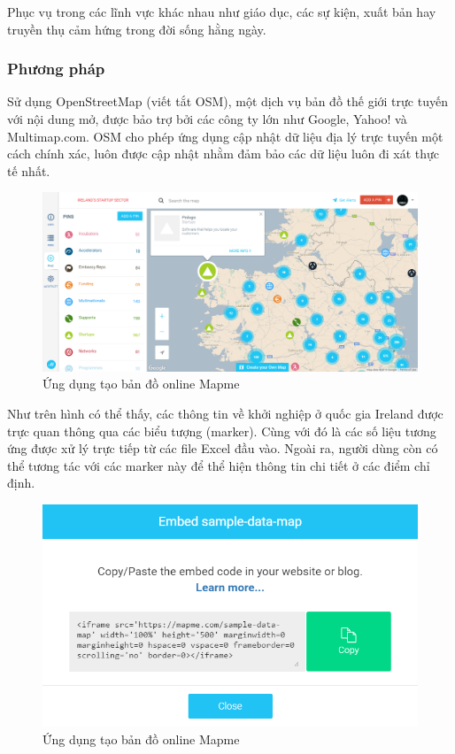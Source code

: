 \documentclass[12pt,a4paper,oneside]{article}
\begin{document}
Phục vụ trong các lĩnh vực khác nhau như giáo dục, các sự kiện, xuất bản hay truyền thụ cảm hứng trong đời sống hằng ngày.

\subsubsection{Phương pháp}
Sử dụng OpenStreetMap (viết tắt OSM), một dịch vụ bản đồ thế giới trực tuyến với nội dung mở, được bảo trợ bởi các công ty lớn như Google, Yahoo! và Multimap.com. OSM cho phép ứng dụng cập nhật dữ liệu địa lý trực tuyến một cách chính xác, luôn được cập nhật nhằm đảm bảo các dữ liệu luôn đi xát thực tế nhất.

\begin{figure}[htp]
    \includegraphics[scale=.4]{image/mapmeOSM}
    \caption{Ứng dụng tạo bản đồ online Mapme}
    \label{refhinh11}
\end{figure}

Như trên hình có thể thấy, các thông tin về khởi nghiệp ở quốc gia Ireland được trực quan thông qua các biểu tượng (marker). Cùng với đó là các số liệu tương ứng được xử lý trực tiếp từ các file Excel đầu vào.
Ngoài ra, người dùng còn có thể tương tác với các marker này để thể hiện thông tin chi tiết ở các điểm chỉ định.

\begin{figure}[htp]
    \includegraphics[scale=.8]{image/mapmeExport}
    \caption{Ứng dụng tạo bản đồ online Mapme}
    \label{refhinh12}
\end{figure}
\end{document}

